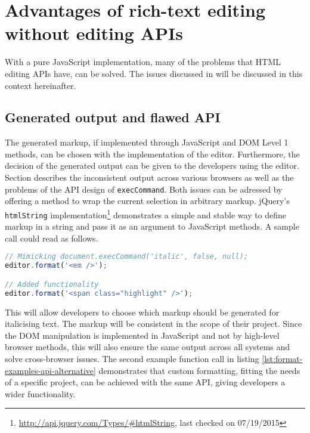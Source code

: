 
\section{Advantages of rich-text editing without editing APIs}

With a pure JavaScript implementation, many of the problems that HTML editing APIs have, can be solved. The issues discussed in  will be discussed in this context hereinafter.

\subsection{Generated output and flawed API} 
\label{subsec:adv_flawed_api}


The generated markup, if implemented through JavaScript and DOM Level 1 methods, can be chosen with the implementation of the editor. Furthermore, the decision of the generated output can be given to the developers using the editor. Section  describes the inconsistent output across various browsers as well as the problems of the API design of \texttt{execCommand}. Both issues can be adressed by offering a method to wrap the current selection in arbitrary markup. jQuery's \texttt{htmlString} implementation\footnote{\url{http://api.jquery.com/Types/\#htmlString}, last checked on 07/19/2015} demonstrates a simple and stable way to define markup in a string and pass it as an argument to JavaScript methods. A sample call could read as follows.

\begin{lstlisting}[language=JavaScript, caption=Example calls to format text, label=lst:format-examples-api-alternative]
// Mimicking document.execCommand('italic', false, null);
editor.format('<em />');

// Added functionality
editor.format('<span class="highlight" />');
\end{lstlisting}

This will allow developers to choose which markup should be generated for italicising text. The markup will be consistent in the scope of their project. Since the DOM manipulation is implemented in JavaScript and not by high-level browser methods, this will also ensure the same output across all systems and solve cross-browser issues. The second example function call in listing \ref{lst:format-examples-api-alternative} demonstrates that custom formatting, fitting the needs of a specific project, can be achieved with the same API, giving developers a wider functionality.

